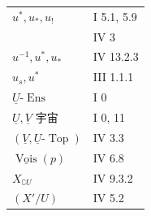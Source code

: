 \begin{longtable}{@{}p{.68\linewidth}p{.27\linewidth}@{}}
$u^*,u_*,u_!$ & I 5.1, 5.9\\
& IV 3\\
$u^{-1},u^*,u_*$ & IV 13.2.3\\
$u_s,u^*$ & III 1.1.1\\
$\underline U$-$\operatorname{Ens}$ & I 0\\
$\underline U,\underline V$ 宇宙 & I 0, 11\\
$(\underline V,\underline U\text{-}\operatorname{Top})$ & IV 3.3\\
$\underline{\operatorname{Vois}}(p)$ & IV 6.8\\
$X_{\complement U}$ & IV 9.3.2\\
$(X'/U)$ & IV 5.2\\
\end{longtable}
\endgroup
